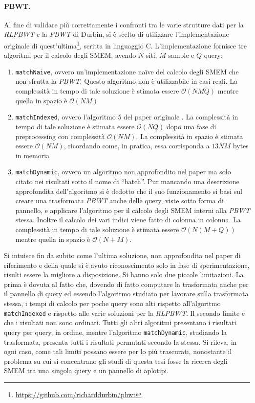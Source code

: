 \paragraph{PBWT.}
Al fine di validare più correttamente i confronti tra le varie strutture dati
per la \textit{RLPBWT} e la \textit{PBWT} di Durbin, si è scelto di utilizzare
l'implementazione originale di
quest'ultima\footnote{\url{https://github.com/richarddurbin/pbwt}}, scritta in 
linguaggio C. L'implementazione
fornisce tre algoritmi per il calcolo degli SMEM, avendo $N$ siti, $M$ sample e
$Q$ query:
\begin{enumerate}
  \item \texttt{matchNaive}, ovvero un'implementazione na\"{i}ve del calcolo
  degli SMEM che non sfrutta la \textit{PBWT}. Questo algoritmo non è
  utilizzabile in casi reali. La complessità in tempo di tale 
  soluzione è stimata essere $\mathcal{O}(NMQ)$ mentre quella in spazio è
  $\mathcal{O}(NM)$
  \item \texttt{matchIndexed}, ovvero l'algoritmo 5 del paper originale
  \cite{pbwt}. La complessità in tempo di tale 
  soluzione è stimata essere $\mathcal{O}(NQ)$ dopo una fase di preprocessing
  con complessità $\mathcal{O}(NM)$. La complessità in spazio è stimata essere
  $\mathcal{O}(NM)$, ricordando come, in pratica, essa corrisponda a $13NM$
  bytes in memoria
  \item \texttt{matchDynamic}, ovvero un algoritmo non approfondito nel paper ma
  solo citato nei risultati sotto il nome di ``batch''. Pur mancando una
  descrizione approfondita dell'algoritmo si è dedotto che il suo funzionamento
  si basi sul creare una trasformata \textit{PBWT} anche delle query, viste
  sotto forma di pannello, e applicare l'algoritmo per il calcolo degli SMEM
  interni alla \textit{PBWT} stessa. Inoltre il calcolo dei vari indici viene
  fatto di colonna in colonna. La complessità in tempo di tale 
  soluzione è stimata essere $\mathcal{O}(N(M+Q))$ mentre quella in spazio è
  $\mathcal{O}(N+M)$. 
\end{enumerate}
Si intuisce fin da subito come l'ultima soluzione, non approfondita nel paper di
riferimento e della quale si è avuto riconoscimento solo in fase di
sperimentazione, risulti essere la migliore a disposizione. Si hanno solo due
piccole limitazioni. La prima è dovuta al fatto che, dovendo di fatto computare
la trasformata anche per il pannello di query ed essendo l'algoritmo studiato
per lavorare sulla trasformata stessa, i tempi di calcolo per poche query sono
alti rispetto all'algoritmo \texttt{matchIndexed} e rispetto alle varie
soluzioni per la \textit{RLPBWT}. Il secondo limite e che i risultati non sono
ordinati. Tutti gli altri algoritmi presentano i risultati query per query, in
ordine, mentre l'algoritmo \texttt{matchDynamic}, studiando la trasformata,
presenta tutti i risultati permutati secondo la stessa. Si rileva, in ogni caso,
come tali limiti possano essere per lo più trascurati, nonostante il problema su
cui si concentrano gli studi di questa tesi fosse la ricerca degli SMEM tra una
singola query e un pannello di aplotipi.
